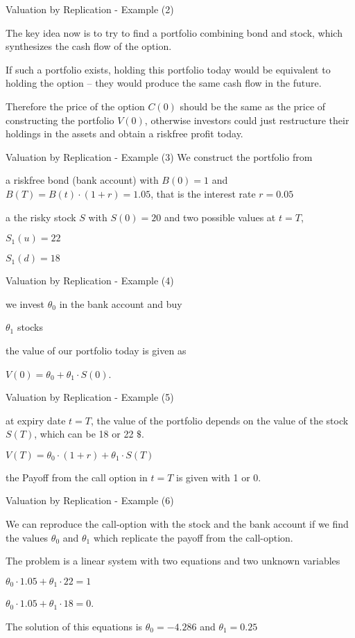 {Valuation by Replication - Example (2)}
  \item The key idea now is to try to find a portfolio combining bond and
stock, which synthesizes the cash flow of the option.
\item If such a portfolio exists, holding this portfolio today would be equivalent
to holding the option -- they would produce the same cash flow in
the future.
\item Therefore the price of the option $C(0)$ should be the same
as the price of constructing the portfolio $V(0)$, otherwise investors
could just restructure their holdings in the assets and obtain a
riskfree profit today.

{Valuation by Replication - Example (3)}
We construct the portfolio from
\item a riskfree bond (bank account) with $B(0)=1$ and $B(T)=B(t) \cdot (1+r) = 1.05$,
that is the interest rate $r=0.05$
\item a the risky stock $S$ with $S(0) = 20$ and two
possible values at $t=T$,
\item $S_1(u)=22$
\item $S_1(d)=18$

{Valuation by Replication - Example (4)}
  \item we invest $\theta_0$ in the bank account and buy
  \item $\theta_1$ stocks
  \item the value of our portfolio today is given as
    \item $V(0) = \theta_0 + \theta_1 \cdot S(0)$.

{Valuation by Replication - Example (5)}
  \item at expiry date $t=T$, the value of the portfolio depends on the value of the stock $S(T)$, which can be 18 or 22 $\$$.
    \item $V(T) = \theta_0 \cdot (1+r) + \theta_1 \cdot S(T)$
  \item the Payoff from the call option in $t=T$ is given with 1 or 0.

{Valuation by Replication - Example (6)}
  \item We can reproduce the call-option with the stock and the bank account if we find the values $\theta_0$ and $\theta_1$ which replicate the payoff from the call-option.
  \item The problem is a linear system with two equations and two unknown variables
    \item $\theta_0 \cdot 1.05 + \theta_1 \cdot 22 = 1$
    \item $\theta_0 \cdot 1.05 + \theta_1 \cdot 18 = 0$.
  \item The solution of this equations is $\theta_0 = -4.286$ and $\theta_1 = 0.25$

